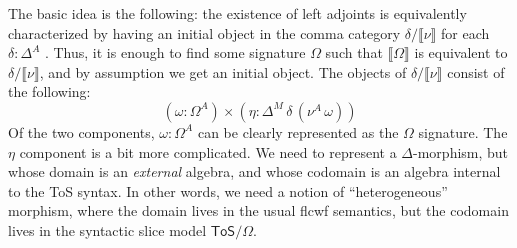 \documentclass[12pt,a4paper,twoside,openany]{book}
\theoremstyle{remark}
\theoremstyle{definition}
\theoremstyle{theorem}
\newcommand{\ToS}{\mathsf{ToS}}
\newcommand{\llb}{\llbracket}
\newcommand{\rrb}{\rrbracket}
\newcommand{\sem}[1]{\llb#1\rrb}
\begin{document}
The basic idea is the following: the existence of left adjoints is equivalently
characterized by having an initial object in the comma category
$\delta/\sem{\nu}$ for each $\delta : \Delta^A$
\cite[Section~IV]{maclane98categories}. Thus, it is enough to find some
signature $\Omega$ such that $\sem{\Omega}$ is equivalent to
$\delta/\sem{\nu}$, and by assumption we get an initial object. The objects
of $\delta/\sem{\nu}$ consist of the following:
\[
  (\omega : \Omega^A) \times (\eta : \Delta^M\,\delta\,(\nu^A\,\omega))
\]
Of the two components, $\omega : \Omega^A$ can be clearly represented as the
$\Omega$ signature. The $\eta$ component is a bit
more complicated. We need to represent a $\Delta$-morphism, but whose domain is
an \emph{external} algebra, and whose codomain is an algebra internal to the ToS
syntax. In other words, we need a notion of ``heterogeneous'' morphism, where
the domain lives in the usual flcwf semantics, but the codomain lives in the
syntactic slice model $\ToS/\Omega$.
\end{document}
